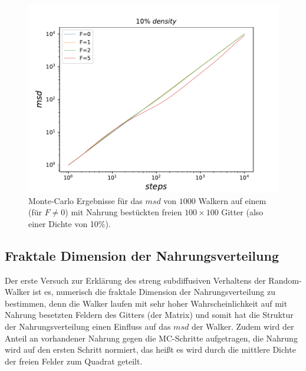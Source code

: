\documentclass[a4paper, 12pt]{scrartcl}
\begin{document}
\begin{figure}[h!]
	\centering
	\includegraphics[scale=0.9]{mult_food.pdf}
	\caption{\label{vieleF}Monte-Carlo Ergebnisse für das $msd$ von $1000$ Walkern auf einem (für $F\neq0$) mit Nahrung bestückten freien $100\times 100$ Gitter (also einer Dichte von 10\%).}
\end{figure}

\newpage

\subsection{Fraktale Dimension der Nahrungsverteilung}
Der erste Versuch zur Erklärung des streng subdiffusiven Verhaltens der Random-Walker ist es, numerisch die fraktale Dimension der Nahrungsverteilung zu bestimmen, denn die Walker laufen mit sehr hoher Wahrscheinlichkeit auf mit Nahrung besetzten Feldern des Gitters (der Matrix) und somit hat die Struktur der Nahrungsverteilung einen Einfluss auf das $msd$ der Walker. Zudem wird der Anteil an vorhandener Nahrung gegen die MC-Schritte aufgetragen, die Nahrung wird auf den ersten Schritt normiert, das heißt es wird durch die mittlere Dichte der freien Felder zum Quadrat geteilt.
\end{document}
